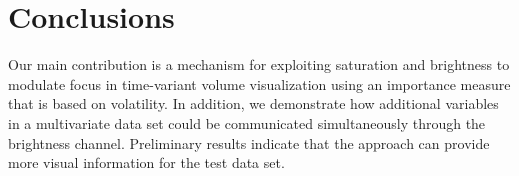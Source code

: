 \section{Conclusions}
Our main contribution is a mechanism for exploiting saturation and brightness to modulate focus in time-variant volume visualization using an importance measure that is based on volatility. In addition, we demonstrate how additional variables in a multivariate data set could be communicated simultaneously through the brightness channel. Preliminary results indicate that the approach can provide more visual information for the test data set.

